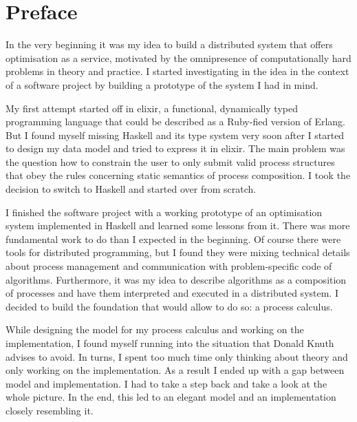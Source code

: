 $\;$
\clearpage
\thispagestyle{empty}
\renewcommand*{\dictumwidth}{.6\textwidth}

\section*{Preface}
In the very beginning it was my idea to build a distributed system that offers optimisation as a service, motivated by the omnipresence of computationally hard problems in theory and practice. I started investigating in the idea in the context of a software project by building a prototype of the system I had in mind.

My first attempt started off in \textsf{elixir}, a functional, dynamically typed programming language that could be described as a \textsf{Ruby}-fied version of \textsf{Erlang}. But I found myself missing \textsf{Haskell} and its type system very soon after I started to design my data model and tried to express it in \textsf{elixir}. The main problem was the question how to constrain the user to only submit valid process structures that obey the rules concerning static semantics of process composition. I took the decision to switch to \textsf{Haskell} and started over from scratch.

I finished the software project with a working prototype of an optimisation system implemented in \textsf{Haskell} and learned some lessons from it. There was more fundamental work to do than I expected in the beginning. Of course there were tools for distributed programming, but I found they were mixing technical details about process management and communication with problem-specific code of algorithms. Furthermore, it was my idea to describe algorithms as a composition of processes and have them interpreted and executed in a distributed system. I decided to build the foundation that would allow to do so: a process calculus.

While designing the model for my process calculus and working on the implementation, I found myself running into the situation that Donald Knuth advises to avoid. In turns, I spent too much time only thinking about theory and only working on the implementation. As a result I ended up with a gap between model and implementation. I had to take a step back and take a look at the whole picture. In the end, this led to an elegant model and an implementation closely resembling it.

